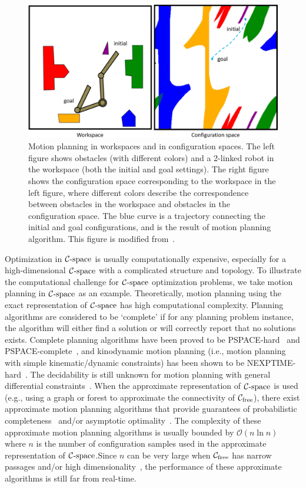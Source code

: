 \begin{figure}[htb]
  \centering
  \includegraphics[width=\linewidth]{figs/1/planning-crop.pdf}
  \caption[Motion planning in workspaces and in configuration spaces]{Motion planning in workspaces and in configuration spaces. The left figure shows obstacles (with different colors) and a 2-linked robot in the workspace (both the initial and goal settings). The right figure shows the configuration space corresponding to the workspace in the left figure, where different colors describe the correspondence between obstacles in the workspace and obstacles in the configuration space. The blue curve is a trajectory connecting the initial and goal configurations, and is the result of motion planning algorithm. This figure is modified from~\cite{cspaceJapplet}. \label{fig:1:planning}}
\end{figure}


Optimization in $\mathcal C\text{-space}$ is usually computationally expensive, especially for a high-dimensional $\mathcal C\text{-space}$ with a complicated structure and topology. To illustrate the computational challenge for $\mathcal C\text{-space}$ optimization problems, we take motion planning in $\mathcal C\text{-space}$ as an example. Theoretically, motion planning using the exact representation of $\mathcal C\text{-space}$ has high computational complexity. Planning algorithms are considered to be `complete' if for any planning problem instance, the algorithm will either find a solution or will correctly report that no solutions exists. Complete planning algorithms have been proved to be PSPACE-hard~\cite{Reif:1979:CMP} and PSPACE-complete~\cite{Canny:1988:AGC}, and kinodynamic motion planning (i.e., motion planning with simple kinematic/dynamic constraints) has been shown to be NEXPTIME-hard~\cite{Canny:1988:CKP}. 
The decidability is still unknown for motion planning with general differential constraints~\cite{Cheng:2007:DMP}. When the approximate representation of $\mathcal C\text{-space}$ is used (e.g., using a graph or forest to approximate the connectivity of $\mathcal C_{\text{free}}$), there exist approximate motion planning algorithms that provide guarantees of probabilistic completeness~\cite{Kavraki96,Kuffner00} and/or asymptotic optimality~\cite{Sertac:IJRR:2011}. The complexity of these approximate motion planning algorithms is usually bounded by $\mathcal O(n\ln n)$ where $n$ is the number of configuration samples used in the approximate representation of $\mathcal C\text{-space}$.Since $n$ can be very large when $\mathcal C_{\text{free}}$ has narrow passages and/or high dimensionality~\cite{Hsu:2006:ijrr}, the performance of these approximate algorithms is still far from real-time.

